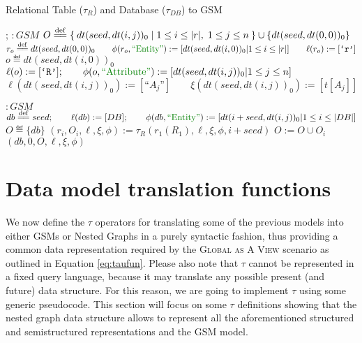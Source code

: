 \begin{algorithm}[!t]
	\caption{Relational Table ($\tau_R$) and Database ($\tau_{DB}$) to GSM}\label{alg:reltonested}
	{
		\begin{minipage}{\linewidth}
			\begin{algorithmic}[1]
				;
				\State
				 $\colon GSM$ 
				\State $O\overset{\mathrm{def}}{=\mathrel{\mkern-3mu}=}\Set{dt(seed,dt(i, j))_0|1\leq i\leq |r|,\;1\leq j\leq n}\cup\{ dt(seed,dt(0,0))_0\}$
				\State $r_o\eqdef dt(seed,dt(0,0))_0\qquad \phi(r_o,\ONTA):=[dt(seed,dt(i,0))_0|1\leq i\leq |r|]\qquad \ell(r_o):=[\texttt{`r'}]$
				\State{} 
				\State $o\eqdef dt(seed,dt(i, 0))_0$
				\State $\ell(o):=[\texttt{`R'}];\qquad \phi(o,\ATTR):=[dt(seed,dt(i, j))_0| 1\leq j\leq n]$
				\State $\ell(dt(seed,dt(i, j))_0):=[\texttt{``}{A_j}\texttt{''}]\qquad \xi(dt(seed,dt(i, j))_0):=[t[A_j]]$
				\EndFor 
				\EndFor
				\State {}
				\EndFunction
				
				\State
				 $\colon GSM$ 
				\State $db\eqdef seed;\qquad \ell(db):=[DB];\qquad \phi(db,\ONTA):=[dt(i+seed,dt(i, j))_0|1\leq i\leq |DB|]$
				\State $O \eqdef\{db\}$
				\State $(r_i,O_i,\ell,\xi,\phi):=\tau_R(r_1(R_1),\ell,\xi,\phi,i+seed)$
				\State $O:= O\cup O_i$
				\EndFor
				\State \Return $(db,0,O,\ell,\xi,\phi)$
				\EndFunction
			\end{algorithmic}
	\end{minipage}}
\end{algorithm}
\section{Data model translation functions}\label{sec:tautonesting}
We now define  the $\tau$ operators for translating some of the previous models into either GSMs or Nested Graphs in a purely syntactic fashion, thus providing a common data representation required by the \textsc{Global as A View} scenario as outlined in Equation \vref{eq:taufun}. Please also note that $\tau$ cannot be represented in a fixed query language, because it may translate any possible present (and future) data structure. For this reason, we are going to implement $\tau$ using some generic pseudocode. This section will focus on some $\tau$ definitions showing that the nested graph data structure allows to represent all the aforementioned structured and semistructured representations and the GSM model.


